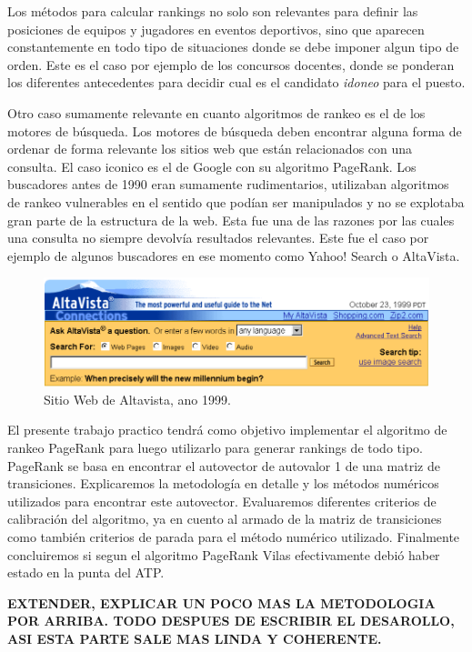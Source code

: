 Los métodos para calcular rankings no solo son relevantes para definir las posiciones de equipos y jugadores en eventos deportivos, sino que aparecen constantemente en todo tipo de situaciones donde se debe imponer algun tipo de orden. Este es el caso por ejemplo de los concursos docentes, donde se ponderan los diferentes antecedentes para decidir cual es el candidato \textit{idoneo} para el puesto.

Otro caso sumamente relevante en cuanto algoritmos de rankeo es el de los motores de búsqueda. Los motores de búsqueda deben encontrar alguna forma de ordenar de forma relevante los sitios web que están relacionados con una consulta. El caso iconico es el de Google con su algoritmo PageRank. Los buscadores antes de 1990 eran sumamente rudimentarios, utilizaban algoritmos de rankeo vulnerables en el sentido que podían ser manipulados y no se explotaba gran parte de la estructura de la web. Esta fue una de las razones por las cuales una consulta no siempre devolvía resultados relevantes. Este fue el caso por ejemplo de algunos buscadores en ese momento como Yahoo! Search o AltaVista.

\begin{figure}[H]
  \centering
  \includegraphics[scale=0.5]{images/altavista}
  \caption{Sitio Web de Altavista, ano 1999.}
\end{figure}

\pagebreak

El presente trabajo practico tendrá como objetivo implementar el algoritmo de rankeo PageRank para luego utilizarlo para generar rankings de todo tipo. PageRank se basa en encontrar el autovector de autovalor 1 de una matriz de transiciones. Explicaremos la metodología en detalle y los métodos numéricos utilizados para encontrar este autovector. Evaluaremos diferentes criterios de calibración del algoritmo, ya en cuento al armado de la matriz de transiciones como también criterios de parada para el método numérico utilizado. Finalmente concluiremos si segun el algoritmo PageRank Vilas efectivamente debió haber estado en la punta del ATP.

\textbf{EXTENDER, EXPLICAR UN POCO MAS LA METODOLOGIA POR ARRIBA. TODO DESPUES DE ESCRIBIR EL DESAROLLO, ASI ESTA PARTE SALE MAS LINDA Y COHERENTE.}